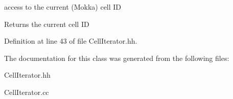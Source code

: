 access to the current (Mokka) cell I\-D 

\begin{DoxyReturn}{Returns}
the current cell I\-D 
\end{DoxyReturn}


Definition at line 43 of file Cell\-Iterator.\-hh.



The documentation for this class was generated from the following files\-:\begin{DoxyCompactItemize}
\item 
Cell\-Iterator.\-hh\item 
Cell\-Iterator.\-cc\end{DoxyCompactItemize}
